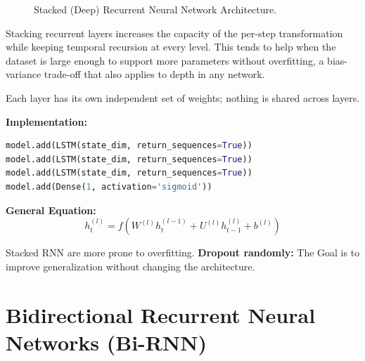 \begin{figure}[htbp]
\caption{Stacked (Deep) Recurrent Neural Network Architecture.}
\label{fig:stacked_rnn_p81}
\end{figure}

Stacking recurrent layers increases the capacity of the per-step transformation while keeping temporal recursion at every level. This tends to help when the dataset is large enough to support more parameters without overfitting, a bias-variance trade-off that also applies to depth in any network.

Each layer has its own independent set of weights; nothing is shared across layers.

\textbf{Implementation:}
\begin{lstlisting}[language=Python]
model.add(LSTM(state_dim, return_sequences=True))
model.add(LSTM(state_dim, return_sequences=True))
model.add(LSTM(state_dim, return_sequences=True))
model.add(Dense(1, activation='sigmoid'))
\end{lstlisting}

\textbf{General Equation:}
\begin{equation}
h_t^{(l)} = f(W^{(l)} h_t^{(l-1)} + U^{(l)} h_{t-1}^{(l)} + b^{(l)})
\end{equation}

Stacked RNN are more prone to overfitting.
\textbf{Dropout randomly:} The Goal is to improve generalization without changing the architecture.

\section{Bidirectional Recurrent Neural Networks (Bi-RNN)}

